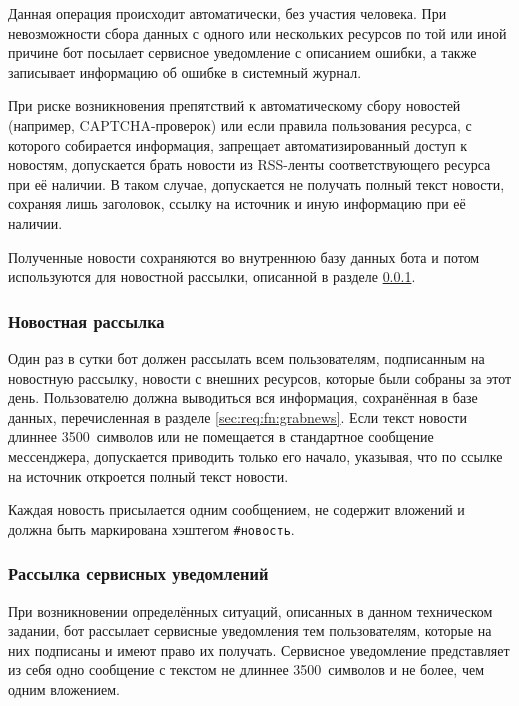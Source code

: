     Данная операция происходит автоматически, без участия человека. При невозможности сбора данных
    с одного или нескольких ресурсов по той или иной причине бот посылает сервисное уведомление
    с описанием ошибки, а также записывает информацию об ошибке в системный журнал.

    При риске возникновения препятствий к автоматическому сбору новостей (например, CAPTCHA-проверок)
    или если правила пользования ресурса, с которого собирается информация, запрещает автоматизированный
    доступ к новостям, допускается брать новости из RSS-ленты соответствующего ресурса при её наличии.
    В таком случае, допускается не получать полный текст новости, сохраняя лишь заголовок,
    ссылку на источник и иную информацию при её наличии.

    Полученные новости сохраняются во внутреннюю базу данных бота и потом используются для новостной
    рассылки, описанной в разделе \ref{sec:req:fn:news}.


\subsubsection{Новостная рассылка}
    \label{sec:req:fn:news}
    Один раз в сутки бот
    должен рассылать всем пользователям, подписанным на новостную рассылку, новости с внешних
    ресурсов, которые были собраны за этот день. Пользователю
    должна выводиться вся информация, сохранённая в базе данных, перечисленная в разделе
    \ref{sec:req:fn:grabnews}. Если текст новости длиннее 3500~символов или не помещается в
    стандартное сообщение мессенджера, допускается приводить только его начало, указывая,
    что по ссылке на источник откроется полный текст новости.

    Каждая новость присылается одним сообщением, не содержит вложений и
    должна быть маркирована хэштегом \hbox{\texttt{\#новость}}.

\subsubsection{Рассылка сервисных уведомлений}
    \label{sec:req:fn:service}
    При возникновении определённых ситуаций, описанных в данном техническом задании,
    бот рассылает сервисные уведомления тем пользователям, которые на них подписаны и имеют
    право их получать. Сервисное уведомление представляет из себя одно сообщение с текстом
    не длиннее 3500~символов и не более, чем одним вложением.

